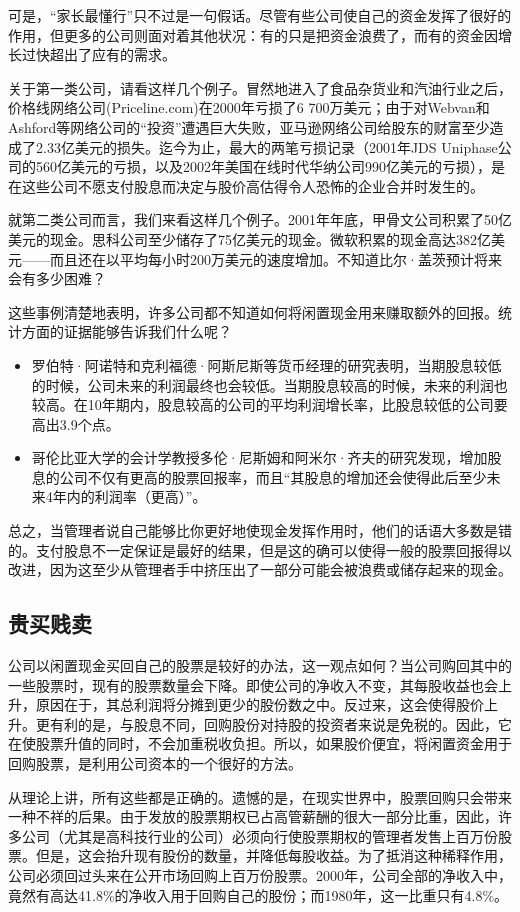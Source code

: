\documentclass[12pt,oneside]{book}
\begin{document}
可是，“家长最懂行”只不过是一句假话。尽管有些公司使自己的资金发挥了很好的作用，但更多的公司则面对着其他状况：有的只是把资金浪费了，而有的资金因增长过快超出了应有的需求。

关于第一类公司，请看这样几个例子。冒然地进入了食品杂货业和汽油行业之后，价格线网络公司(Priceline.com)在2000年亏损了6 700万美元；由于对Webvan和Ashford等网络公司的“投资”遭遇巨大失败，亚马逊网络公司给股东的财富至少造成了2.33亿美元的损失。迄今为止，最大的两笔亏损记录（2001年JDS Uniphase公司的560亿美元的亏损，以及2002年美国在线时代华纳公司990亿美元的亏损），是在这些公司不愿支付股息而决定与股价高估得令人恐怖的企业合并时发生的。

就第二类公司而言，我们来看这样几个例子。2001年年底，甲骨文公司积累了50亿美元的现金。思科公司至少储存了75亿美元的现金。微软积累的现金高达382亿美元——而且还在以平均每小时200万美元的速度增加。不知道比尔·盖茨预计将来会有多少困难？

这些事例清楚地表明，许多公司都不知道如何将闲置现金用来赚取额外的回报。统计方面的证据能够告诉我们什么呢？

\begin{itemize}
\item 罗伯特·阿诺特和克利福德·阿斯尼斯等货币经理的研究表明，当期股息较低的时候，公司未来的利润最终也会较低。当期股息较高的时候，未来的利润也较高。在10年期内，股息较高的公司的平均利润增长率，比股息较低的公司要高出3.9个点。
\item 哥伦比亚大学的会计学教授多伦·尼斯姆和阿米尔·齐夫的研究发现，增加股息的公司不仅有更高的股票回报率，而且“其股息的增加还会使得此后至少未来4年内的利润率（更高）”。
\end{itemize}

总之，当管理者说自己能够比你更好地使现金发挥作用时，他们的话语大多数是错的。支付股息不一定保证是最好的结果，但是这的确可以使得一般的股票回报得以改进，因为这至少从管理者手中挤压出了一部分可能会被浪费或储存起来的现金。


\subsection{贵买贱卖}
公司以闲置现金买回自己的股票是较好的办法，这一观点如何？当公司购回其中的一些股票时，现有的股票数量会下降。即使公司的净收入不变，其每股收益也会上升，原因在于，其总利润将分摊到更少的股份数之中。反过来，这会使得股价上升。更有利的是，与股息不同，回购股份对持股的投资者来说是免税的。因此，它在使股票升值的同时，不会加重税收负担。所以，如果股价便宜，将闲置资金用于回购股票，是利用公司资本的一个很好的方法。

从理论上讲，所有这些都是正确的。遗憾的是，在现实世界中，股票回购只会带来一种不祥的后果。由于发放的股票期权已占高管薪酬的很大一部分比重，因此，许多公司（尤其是高科技行业的公司）必须向行使股票期权的管理者发售上百万份股票。但是，这会抬升现有股份的数量，并降低每股收益。为了抵消这种稀释作用，公司必须回过头来在公开市场回购上百万份股票。2000年，公司全部的净收入中，竟然有高达41.8\%的净收入用于回购自己的股份；而1980年，这一比重只有4.8\%。
\end{document}

